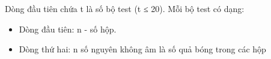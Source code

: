 Dòng đầu tiên chứa t là số bộ test (t ≤ 20). Mỗi bộ test có dạng:  
\begin{itemize}
	\item     Dòng đầu tiên: n - số hộp.    


	\item     Dòng thứ hai: n số nguyên không âm là số quả bóng trong các hộp   
\end{itemize}